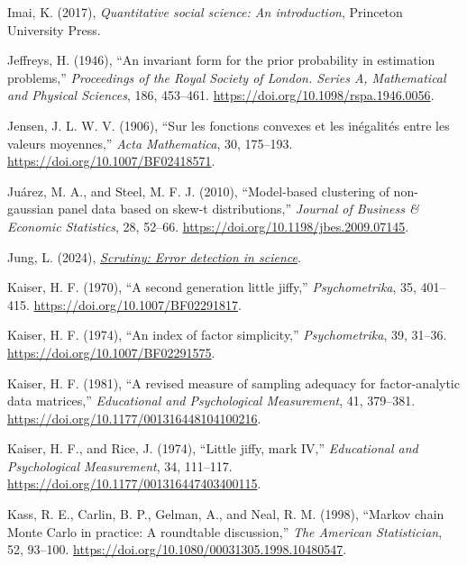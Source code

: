 \documentclass[
  10pt,
  a4paper,
  twoside]{article}
\newlength{\cslhangindent}
\newenvironment{CSLReferences}[2] %
 {\begin{list}{}{%
  \setlength{\itemindent}{0pt}
  \setlength{\leftmargin}{0pt}
  \setlength{\parsep}{0pt}
  \ifodd #1
   \setlength{\leftmargin}{\cslhangindent}
   \setlength{\itemindent}{-1\cslhangindent}
  \fi
  \setlength{\itemsep}{#2\baselineskip}}}
 {\end{list}}
\begin{document}
\begin{CSLReferences}{1}{0}
Imai, K. (2017), \emph{Quantitative social science: An introduction}, Princeton University Press.

Jeffreys, H. (1946), {``An invariant form for the prior probability in estimation problems,''} \emph{Proceedings of the Royal Society of London. Series A, Mathematical and Physical Sciences}, 186, 453--461. \url{https://doi.org/10.1098/rspa.1946.0056}.

Jensen, J. L. W. V. (1906), {``Sur les fonctions convexes et les inégalités entre les valeurs moyennes,''} \emph{Acta Mathematica}, 30, 175--193. \url{https://doi.org/10.1007/BF02418571}.

Juárez, M. A., and Steel, M. F. J. (2010), {``Model-based clustering of non-gaussian panel data based on skew-t distributions,''} \emph{Journal of Business \& Economic Statistics}, 28, 52--66. \url{https://doi.org/10.1198/jbes.2009.07145}.

Jung, L. (2024), \emph{\href{https://CRAN.R-project.org/package=scrutiny}{Scrutiny: Error detection in science}}.

Kaiser, H. F. (1970), {``A second generation little jiffy,''} \emph{Psychometrika}, 35, 401--415. \url{https://doi.org/10.1007/BF02291817}.

Kaiser, H. F. (1974), {``An index of factor simplicity,''} \emph{Psychometrika}, 39, 31--36. \url{https://doi.org/10.1007/BF02291575}.

Kaiser, H. F. (1981), {``A revised measure of sampling adequacy for factor-analytic data matrices,''} \emph{Educational and Psychological Measurement}, 41, 379--381. \url{https://doi.org/10.1177/001316448104100216}.

Kaiser, H. F., and Rice, J. (1974), {``Little jiffy, mark IV,''} \emph{Educational and Psychological Measurement}, 34, 111--117. \url{https://doi.org/10.1177/001316447403400115}.

Kass, R. E., Carlin, B. P., Gelman, A., and Neal, R. M. (1998), {``Markov chain {Monte Carlo} in practice: A roundtable discussion,''} \emph{The American Statistician}, 52, 93--100. \url{https://doi.org/10.1080/00031305.1998.10480547}.


\end{CSLReferences}
\end{document}
